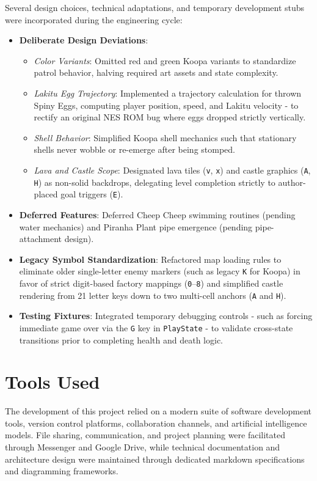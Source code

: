 \documentclass[12pt, a4paper]{article}
\begin{document}
Several design choices, technical adaptations, and temporary development stubs were incorporated during the engineering cycle:
\begin{itemize}
\item \textbf{Deliberate Design Deviations}:
\begin{itemize}
\item \textit{Color Variants}: Omitted red and green Koopa variants to standardize patrol behavior, halving required art assets and state complexity.
\item \textit{Lakitu Egg Trajectory}: Implemented a trajectory calculation for thrown Spiny Eggs, computing player position, speed, and Lakitu velocity - to rectify an original NES ROM bug where eggs dropped strictly vertically.
\item \textit{Shell Behavior}: Simplified Koopa shell mechanics such that stationary shells never wobble or re-emerge after being stomped.
\item \textit{Lava and Castle Scope}: Designated lava tiles (\texttt{v}, \texttt{x}) and castle graphics (\texttt{A}, \texttt{H}) as non-solid backdrops, delegating level completion strictly to author-placed goal triggers (\texttt{E}).
\end{itemize}
\item \textbf{Deferred Features}: Deferred Cheep Cheep swimming routines (pending water mechanics) and Piranha Plant pipe emergence (pending pipe-attachment design).
\item \textbf{Legacy Symbol Standardization}: Refactored map loading rules to eliminate older single-letter enemy markers (such as legacy \texttt{K} for Koopa) in favor of strict digit-based factory mappings (\texttt{0}--\texttt{8}) and simplified castle rendering from 21 letter keys down to two multi-cell anchors (\texttt{A} and \texttt{H}).
\item \textbf{Testing Fixtures}: Integrated temporary debugging controls - such as forcing immediate game over via the \texttt{G} key in \texttt{PlayState} - to validate cross-state transitions prior to completing health and death logic.
\end{itemize}

\newpage

\section{Tools Used}

The development of this project relied on a modern suite of software development tools, version control platforms, collaboration channels, and artificial intelligence models. File sharing, communication, and project planning were facilitated through Messenger and Google Drive, while technical documentation and architecture design were maintained through dedicated markdown specifications and diagramming frameworks.
\end{document}
